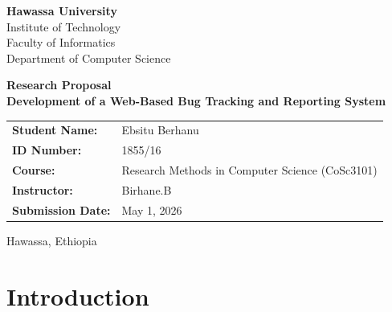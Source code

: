 \documentclass[12pt]{article}
\begin{document}
\onehalfspacing


\begin{titlepage}

\begin{center}

{\large \textbf{Hawassa University}}\\[0.3cm]
{\normalsize Institute of Technology}\\[0.3cm]
{\normalsize Faculty of Informatics}\\[0.3cm]
{\normalsize Department of Computer Science}

\vspace{2cm}

{\LARGE \textbf{Research Proposal}}\\[0.8cm]

{\Large \textbf{Development of a Web-Based Bug Tracking and Reporting System}}

\vspace{2.5cm}

\end{center}

\noindent
\begin{tabular}{ll}
\textbf{Student Name:} & Ebsitu Berhanu \\
\textbf{ID Number:} & 1855/16 \\
\textbf{Course:} & Research Methods in Computer Science (CoSc3101) \\
\textbf{Instructor:} & Birhane.B \\
\textbf{Submission Date:} & May 1, 2026 \\
\end{tabular}

\vfill

\begin{center}
{\normalsize Hawassa, Ethiopia}
\end{center}

\end{titlepage}

\newpage
\tableofcontents
\newpage


\section{Introduction}
\end{document}
